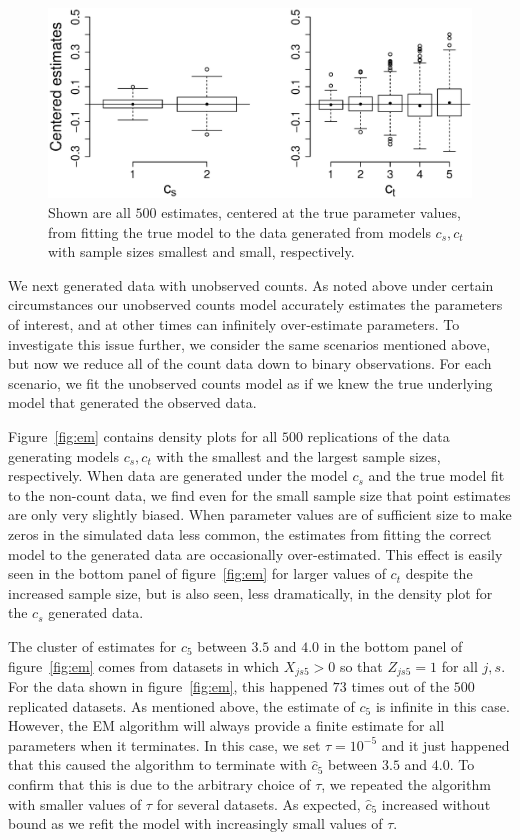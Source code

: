 \begin{figure}
  \centering
  \includegraphics[scale=0.5]{bp}
  \caption{Shown are all $500$ estimates, centered at the true parameter values, from fitting the true model to the data generated from models $c_s,c_t$ with sample sizes smallest and small, respectively.}
  \label{fig:bp}
\end{figure}

We next generated data with unobserved counts.  As noted above under certain circumstances our unobserved counts model accurately estimates the parameters of interest, and at other times can infinitely over-estimate parameters.  To investigate this issue further, we consider the same scenarios mentioned above, but now we reduce all of the count data down to binary observations.  For each scenario, we fit the unobserved counts model as if we knew the true underlying model that generated the observed data.

Figure~\ref{fig:em} contains density plots for all $500$ replications of the data generating models $c_s,c_t$ with the smallest and the largest sample sizes, respectively.  When data are generated under the model $c_s$ and the true model fit to the non-count data, we find even for the small sample size that point estimates are only very slightly biased.  When parameter values are of sufficient size to make zeros in the simulated data less common, the estimates from fitting the correct model to the generated data are occasionally over-estimated.  This effect is easily seen in the bottom panel of figure~\ref{fig:em} for larger values of $c_t$ despite the increased sample size, but is also seen, less dramatically, in the density plot for the $c_s$ generated data.  

The cluster of estimates for $c_5$ between $3.5$ and $4.0$ in the bottom panel of figure~\ref{fig:em} comes from datasets in which $X_{js5}>0$ so that $Z_{js5}=1$ for all $j,s$.  For the data shown in figure~\ref{fig:em}, this happened $73$ times out of the $500$ replicated datasets.  As mentioned above, the estimate of $c_5$ is infinite in this case. However, the EM algorithm will always provide a finite estimate for all parameters when it terminates.  In this case, we set $\tau=10^{-5}$ and it just happened that this caused the algorithm to terminate with $\hat c_5$ between $3.5$ and $4.0$.  To confirm that this is due to the arbitrary choice of $\tau$, we repeated the algorithm with smaller values of $\tau$ for several datasets. As expected, $\hat c_5$ increased without bound as we refit the model with increasingly small values of $\tau$.

